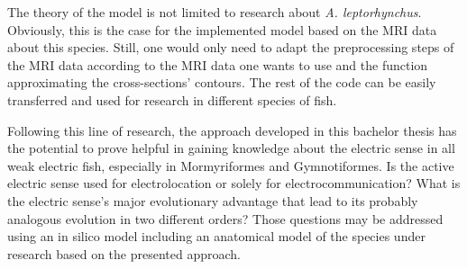 The theory of the model is not limited to research about \textit{A. leptorhynchus}. Obviously, this is the case for the implemented model based on the MRI data about this species. Still, one would only need to adapt the preprocessing steps of the MRI data according to the MRI data one wants to use and the function approximating the cross-sections' contours. The rest of the code can be easily transferred and used for research in different species of fish. 

Following this line of research, the approach developed in this bachelor thesis has the potential to prove helpful in gaining knowledge about the electric sense in all weak electric fish, especially in Mormyriformes and Gymnotiformes. Is the active electric sense used for electrolocation or solely for electrocommunication? What is the electric sense's major evolutionary advantage that lead to its probably analogous evolution in two different orders? Those questions may be addressed using an in silico model including an anatomical model of the species under research based on the presented approach. 